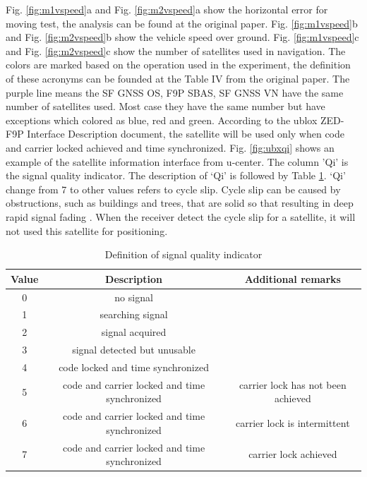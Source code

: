 \documentclass[letterpaper, 10 pt,onecolumn]{article}
\begin{document}
	Fig. \ref{fig:m1vspeed}a and Fig. \ref{fig:m2vspeed}a show the horizontal error for moving test, the analysis can be found at the original paper. Fig. \ref{fig:m1vspeed}b and Fig. \ref{fig:m2vspeed}b show the vehicle speed over ground. Fig. \ref{fig:m1vspeed}c and Fig. \ref{fig:m2vspeed}c show the number of satellites used in navigation. The colors are marked based on the operation used in the experiment, the definition of these acronyms can be founded at the Table IV from the original paper. The purple line means the SF GNSS OS, F9P SBAS, SF GNSS VN have the same number of satellites used. Most case they have the same number but have exceptions which colored as blue, red and green. According to the ublox ZED-F9P Interface Description document, the satellite will be used only when code and carrier locked achieved and time synchronized. Fig. \ref{fig:ubxqi} shows an example of the satellite information interface from u-center. The column 'Qi' is the signal quality indicator. The description of `Qi' is followed by Table \ref{tab:qi}. `Qi' change from 7 to other values refers to cycle slip. Cycle slip can be caused by obstructions, such as buildings and trees, that are solid so that resulting in deep rapid signal fading \cite{sennott1992use}. When the receiver detect the cycle slip for a satellite, it will not used this satellite for positioning.
	
	\begin{table}[H]
		\centering
		\begin{tabular}{|c|c|c|}
			\hline
			Value & Description                                   & Additional remarks                 \\ \hline
			0     & no signal                                     &                                    \\ \hline
			1     & searching signal                              &                                    \\ \hline
			2     & signal acquired                               &                                    \\ \hline
			3     & signal detected but unusable                  &                                    \\ \hline
			4     & code locked and time synchronized             &                                    \\ \hline
			5     & code and carrier locked and time synchronized & carrier lock has not been achieved \\ \hline
			6     & code and carrier locked and time synchronized & carrier lock is intermittent       \\ \hline
			7     & code and carrier locked and time synchronized & carrier lock achieved              \\ \hline
		\end{tabular}
		\label{tab:qi}
		\caption{Definition of signal quality indicator}
	\end{table}
	
\end{document}
